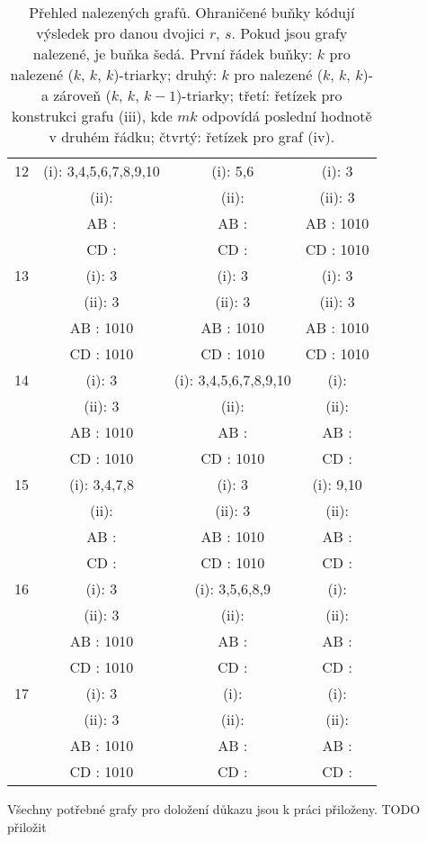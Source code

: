 \begin{table}[h]
{\begin{tabular}{| c || c | c | c |}
12 & (i): 3,4,5,6,7,8,9,10 & (i): 5,6 & \cellcolor{lightgray}(i): 3\\
 & (ii):  & (ii):  & \cellcolor{lightgray}(ii): 3\\
 & AB :  & AB :  & \cellcolor{lightgray}AB : 1010\\
 & CD :  & CD :  & \cellcolor{lightgray}CD : 1010\\\hline

13 & \cellcolor{lightgray}(i): 3 & \cellcolor{lightgray}(i): 3 & \cellcolor{lightgray}(i): 3\\
 & \cellcolor{lightgray}(ii): 3 & \cellcolor{lightgray}(ii): 3 & \cellcolor{lightgray}(ii): 3\\
 & \cellcolor{lightgray}AB : 1010 & \cellcolor{lightgray}AB : 1010 & \cellcolor{lightgray}AB : 1010\\
 & \cellcolor{lightgray}CD : 1010 & \cellcolor{lightgray}CD : 1010 & \cellcolor{lightgray}CD : 1010\\\hline

14 & \cellcolor{lightgray}(i): 3 & (i): 3,4,5,6,7,8,9,10 & (i): \\
 & \cellcolor{lightgray}(ii): 3 & (ii):  & (ii): \\
 & \cellcolor{lightgray}AB : 1010 & AB :  & AB : \\
 & \cellcolor{lightgray}CD : 1010 & CD : 1010 & CD : \\\hline

15 & (i): 3,4,7,8 & \cellcolor{lightgray}(i): 3 & (i): 9,10\\
 & (ii):  & \cellcolor{lightgray}(ii): 3 & (ii): \\
 & AB :  & \cellcolor{lightgray}AB : 1010 & AB : \\
 & CD :  & \cellcolor{lightgray}CD : 1010 & CD : \\\hline

16 & \cellcolor{lightgray}(i): 3 & (i): 3,5,6,8,9 & (i): \\
 & \cellcolor{lightgray}(ii): 3 & (ii):  & (ii): \\
 & \cellcolor{lightgray}AB : 1010 & AB :  & AB : \\
 & \cellcolor{lightgray}CD : 1010 & CD :  & CD : \\\hline

17 & \cellcolor{lightgray}(i): 3 & (i):  & (i): \\
 & \cellcolor{lightgray}(ii): 3 & (ii):  & (ii): \\
 & \cellcolor{lightgray}AB : 1010 & AB :  & AB : \\
 & \cellcolor{lightgray}CD : 1010 & CD :  & CD : \\\hline

\end{tabular}}
\caption{Přehled nalezených grafů. Ohraničené buňky kódují výsledek pro danou dvojici $r$, $s$. Pokud jsou grafy nalezené, je buňka šedá. První řádek buňky: $k$ pro nalezené ($k$, $k$, $k$)-triarky; druhý: $k$ pro nalezené ($k$, $k$, $k$)- a zároveň ($k$, $k$, $k-1$)-triarky; třetí: řetízek pro konstrukci grafu (iii), kde $mk$ odpovídá poslední hodnotě v druhém řádku; čtvrtý: řetízek pro graf (iv).}
\label{obr03:tabvysledkycele}
\end{table}

Všechny potřebné grafy pro doložení důkazu jsou k práci přiloženy. TODO přiložit
